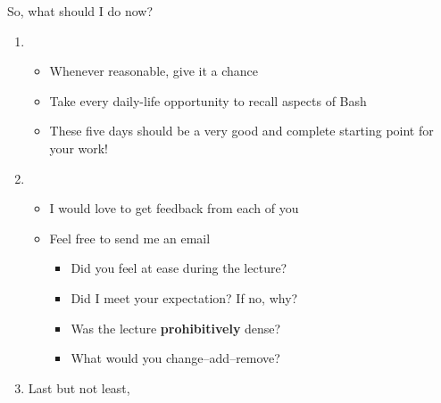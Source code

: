 \begin{frame}{So, what should I do now?}
    \vspace{-2mm}
    \begin{enumerate}
        \setlength{\itemsep}{1mm}
        \item<1-> 
                  \begin{itemize}
                    \item Whenever reasonable, give it a chance
                    \item Take every daily-life opportunity to recall aspects of Bash
                    \item These five days should be a very good and complete starting point for your work!
                  \end{itemize}
        \item<2-> 
                  \begin{itemize}
                      \item I would love to get feedback from each of you
                      \item Feel free to send me an email \,
                            \begin{itemize}
                                \item Did you feel at ease during the lecture?
                                \item Did I meet your expectation? If no, why?
                                \item Was the lecture \textbf{prohibitively} dense? 
                                \item What would you change--add--remove?
                            \end{itemize}
                  \end{itemize}
        \item<3-> Last but not least,  $\;$
    \end{enumerate}
\end{frame}